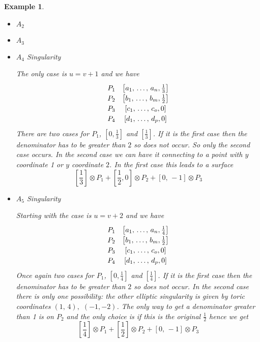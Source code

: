 \documentclass[12pt]{amsart}
\theoremstyle{plain}
\newtheorem{ex}[thm]{Example}
\begin{document}
\begin{ex}
\begin{itemize}
\item $A_2$

\item $A_3$

\item \begin{bf} $A_4$ Singularity \end{bf}

The only case is $u = v+1$ and we have
\[\def\arraystretch{1.2}
\begin{array}{cc}
P_1 & \left[ a_1, \, \dots , \, a_n, \frac{1}{3} \right] \\ 
P_2 & \left[b_1 , \, \dots, \, b_m, \frac{1}{2} \right] \\
P_3 & \left[c_1, \, \dots, \, c_o, 0\right] \\
P_4 & \left[d_1, \, \dots, \, d_p, 0\right]  \\
\end{array}
\]
There are two cases for $P_1$,  $[0, \frac{1}{3}]$ and $[\frac{1}{3}]$. If it is the first case then the denominator has to be greater than $2$ so does not occur. So only the second case occurs. In the second case we can have it connecting to a point with $y$ coordinate 1 or $y$ coordinate $2$. In the first case this leads to a surface 
\[
\left[\frac{1}{3} \right] \otimes P_1 + \left[\frac{1}{2}, 0 \right] \otimes P_2 + [0, \,- 1] \otimes P_3
\]


\item \begin{bf} $A_5$ Singularity \end{bf}

Starting with the case is $u = v+2$ and we have
\[\def\arraystretch{1.2}
\begin{array}{cc}
P_1 & \left[ a_1, \, \dots , \, a_n, \frac{1}{4} \right] \\ 
P_2 & \left[b_1 , \, \dots, \, b_m, \frac{1}{2} \right] \\
P_3 & \left[c_1, \, \dots, \, c_o, 0\right] \\
P_4 & \left[d_1, \, \dots, \, d_p, 0\right]  \\
\end{array}
\]
Once again two cases for $P_1$,  $[0, \frac{1}{4}]$ and $[\frac{1}{4}]$. If it is the first case then the denominator has to be greater than $2$ so does not occur. In the second case there is only one possibility: the other elliptic singularity is given by toric coordinates $(1, \, 4),$ $(-1, -2)$. The only way to get a denominator greater than 1 is on $P_2$ and  the only choice is if this is the original $\frac{1}{2}$ hence we get
\[
\left[\frac{1}{4} \right] \otimes P_1 + \left[\frac{1}{2} \right] \otimes P_2 + [0, \, -1] \otimes P_3
\]


\end{itemize}
\end{ex}
\end{document}
